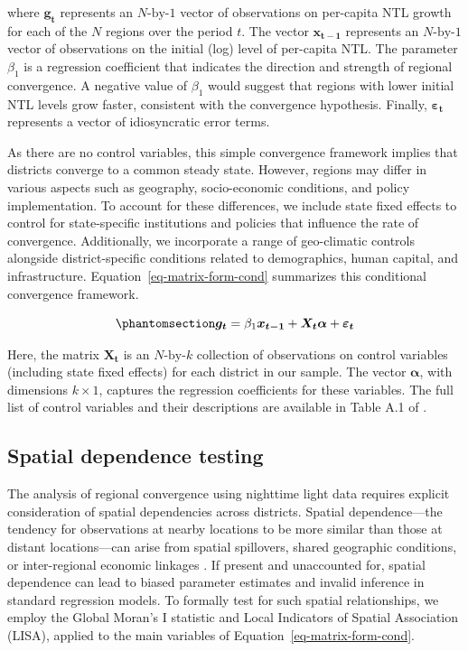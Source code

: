 \documentclass[
  a4paper, 
  twoside,
  review
]{article}
\begin{document}
where \(\boldsymbol{g_t}\) represents an \(N\text{-by-}1\) vector of
observations on per-capita NTL growth for each of the \(N\) regions over
the period \(t\). The vector \(\boldsymbol{x_{t-1}}\) represents an
\(N\text{-by-}1\) vector of observations on the initial (log) level of
per-capita NTL. The parameter \(\beta_1\) is a regression coefficient
that indicates the direction and strength of regional convergence. A
negative value of \(\beta_1\) would suggest that regions with lower
initial NTL levels grow faster, consistent with the convergence
hypothesis. Finally, \(\boldsymbol{\varepsilon_t}\) represents a vector
of idiosyncratic error terms.

As there are no control variables, this simple convergence framework
implies that districts converge to a common steady state. However,
regions may differ in various aspects such as geography, socio-economic
conditions, and policy implementation. To account for these differences,
we include state fixed effects to control for state-specific
institutions and policies that influence the rate of convergence.
Additionally, we incorporate a range of geo-climatic controls alongside
district-specific conditions related to demographics, human capital, and
infrastructure. Equation~\ref{eq-matrix-form-cond} summarizes this
conditional convergence framework.

\begin{equation}\phantomsection\label{eq-matrix-form-cond}{
\boldsymbol{g_t} =  \beta_1 \boldsymbol{x_{t-1}} + \boldsymbol{X_t} \boldsymbol{\alpha}  + \boldsymbol{\varepsilon_t}
}\end{equation}

Here, the matrix \(\boldsymbol{X_t}\) is an \(N\text{-by-}k\) collection
of observations on control variables (including state fixed effects) for
each district in our sample. The vector \(\boldsymbol{\alpha}\), with
dimensions \(k \times 1\), captures the regression coefficients for
these variables. The full list of control variables and their
descriptions are available in Table A.1 of
\citet{chanda_kabiraj_district_convergence}.

\subsection{Spatial dependence
testing}\label{spatial-dependence-testing}

The analysis of regional convergence using nighttime light data requires
explicit consideration of spatial dependencies across districts. Spatial
dependence---the tendency for observations at nearby locations to be
more similar than those at distant locations---can arise from spatial
spillovers, shared geographic conditions, or inter-regional economic
linkages \citep{anselin_spatial_analysis}. If present and unaccounted
for, spatial dependence can lead to biased parameter estimates and
invalid inference in standard regression models. To formally test for
such spatial relationships, we employ the Global Moran's I statistic and
Local Indicators of Spatial Association (LISA), applied to the main
variables of Equation~\ref{eq-matrix-form-cond}.
\end{document}
